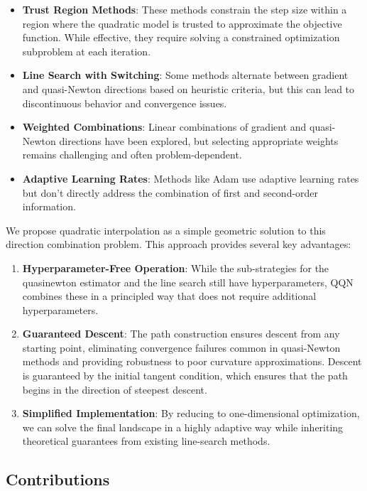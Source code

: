 \begin{itemize}
\item
  \textbf{Trust Region Methods}: These methods constrain the step size within a region where the quadratic model is trusted to approximate the objective function. While effective, they require solving a constrained optimization subproblem at each iteration.
\item
  \textbf{Line Search with Switching}: Some methods alternate between gradient and quasi-Newton directions based on heuristic criteria, but this can lead to discontinuous behavior and convergence issues.
\item
  \textbf{Weighted Combinations}: Linear combinations of gradient and quasi-Newton directions have been explored, but selecting appropriate weights remains challenging and often problem-dependent.
\item
  \textbf{Adaptive Learning Rates}: Methods like Adam use adaptive learning rates but don't directly address the combination of first and second-order information.
\end{itemize}

We propose quadratic interpolation as a simple geometric solution to this direction combination problem.
This approach provides several key advantages:

\begin{enumerate}
\def\labelenumi{\arabic{enumi}.}
\item
  \textbf{Hyperparameter-Free Operation}: While the sub-strategies for the quasinewton estimator and the line search still have hyperparameters, QQN combines these in a principled way that does not require additional hyperparameters.
\item
  \textbf{Guaranteed Descent}: The path construction ensures descent from any starting point, eliminating convergence failures common in quasi-Newton methods and providing robustness to poor curvature approximations.
  Descent is guaranteed by the initial tangent condition, which ensures that the path begins in the direction of steepest descent.
\item
  \textbf{Simplified Implementation}: By reducing to one-dimensional optimization, we can solve the final landscape in a highly adaptive way while inheriting theoretical guarantees from existing line-search methods.
\end{enumerate}

\hypertarget{contributions}{%
\subsection{Contributions}\label{contributions}}

